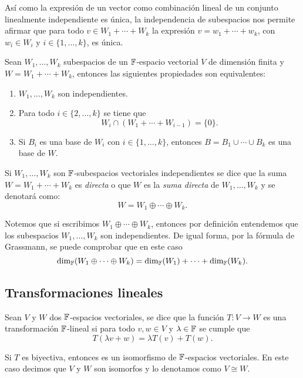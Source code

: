 Así como la expresión de un vector como combinación lineal de un conjunto linealmente independiente es única, la independencia de subespacios nos permite afirmar que para todo $v \in W_1 + \cdots + W_k$ la expresión $v = w_1 + \cdots + w_k$, con $w_i \in W_i$ y $i \in \{1, \ldots, k\}$, es única.
\begin{teor}
  Sean $W_1, \ldots, W_k$ subespacios de un $\mathbb{F}$-espacio vectorial $V$ de dimensión finita y $W = W_1 + \cdots + W_k$, entonces las siguientes propiedades son equivalentes:
  \begin{enumerate}
    \item $W_1, \ldots, W_k$ son independientes.
    \item Para todo $i \in \{2, \ldots, k\}$ se tiene que
            \[ W_i \cap (W_1 + \cdots + W_{i-1})  = \{0\}. \]
    \item Si $B_i$ es una base de $W_i$ con $i \in \{1, \ldots, k\}$, entonces $B = B_1 \cup  \cdots \cup  B_k$ es una base de $W$.
  \end{enumerate}
\end{teor}

\begin{defi}
  Si $W_1, \ldots, W_k$ son $\mathbb{F}$-subespacios vectoriales independientes se dice que la suma $W = W_1 + \cdots + W_k$ es \emph{directa} o que $W$ es la \emph{suma directa} de  $W_1, \ldots, W_k$ y se denotará como:
    \[ W =  W_1 \oplus \cdots \oplus W_k.\]
\end{defi}

Notemos que si escribimos $W_1 \oplus \cdots \oplus W_k$, entonces por definición entendemos que los subespacios $W_1, \ldots, W_k$ son independientes. De igual forma, por la fórmula de Grassmann, se puede comprobar que en este caso
\[ \dim_{\mathbb{F}} (W_1 \oplus \cdots \oplus W_k) = \dim_{\mathbb{F}} (W_1) + \cdots + \dim_{\mathbb{F}} (W_k).\]

\subsection{Transformaciones lineales}

\begin{defi}
  Sean $V$ y $W$ dos $\mathbb{F}$-espacios vectoriales, se dice que la función $T\colon V\to W$ es una transformación $\mathbb{F}$-lineal si para todo $v,w \in V$ y $\lambda \in \mathbb{F}$ se cumple que 
  \[ T(\lambda v + w) = \lambda T(v) + T(w).\]

  Si $T$ es biyectiva, entonces es un isomorfismo de $\mathbb{F}$-espacios vectoriales. En este caso decimos que $V$ y $W$ son isomorfos y lo denotamos como $V \cong W$.
\end{defi}

